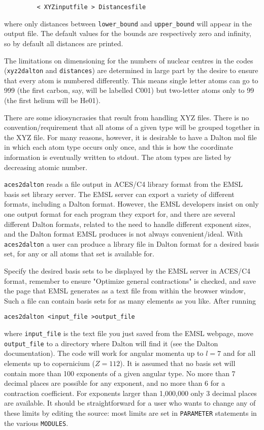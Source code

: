 \noindent
\verb|         < XYZinputfile > Distancesfile|

\noindent
where only distances between \verb|lower_bound| and \verb|upper_bound| will
appear in the output file.  The default values for the bounds are
respectively zero and infinity, so by default all distances are printed.

The limitations on dimensioning for the numbers of nuclear centres in
the codes (\verb|xyz2dalton| and \verb|distances|) are determined in large part by 
the desire to ensure that every atom is numbered differently.  This means
single letter atoms can go to 999 (the first carbon, say, will be labelled
C001) but two-letter atoms only to 99 (the first helium will be He01).

There are some idiosyncrasies that result from handling XYZ files.
There is no convention/require\-ment that all atoms of a given
type will be grouped together in the XYZ file.  For many reasons,
however, it is desirable to have a Dalton
mol file in which each atom type occurs only once, and this is how the
coordinate information is eventually
written to stdout.  The atom types are listed by decreasing atomic number.

\verb|aces2dalton| reads a file output in ACES/C4 library format from
the EMSL 
basis set library server.  The EMSL server can
export a variety of different formats, including a Dalton format.
However, the EMSL developers insist on only one output format for each
program they export for, and there are several different Dalton
formats, related to the need to handle different exponent sizes, and
the Dalton format EMSL produces is not always convenient/ideal.  With
\verb|aces2dalton| a user can produce a library file in Dalton format
for a desired basis set, for any or all atoms that set is available for.

Specify the desired basis sets to be displayed by the EMSL server in
ACES/C4 format, remember to ensure "Optimize general contractions" is
checked, and save the page that EMSL generates as a text file from
within the browser window, Such a file can contain basis sets for as
many elements as you like.  After running

\noindent
\verb|aces2dalton <input_file >output_file|

\noindent
where \verb|input_file| is the text file you just saved from the EMSL
webpage, 
move \verb|output_file| to a directory where Dalton will find it
(see the Dalton documentation).
The code will work for angular momenta up to $l=7$ and for all
elements up to copernicium ($Z=112$).
It is assumed that no basis set will contain more than 100 exponents
of a given angular type.
No more than 7 decimal places are possible for any exponent, and
no more than 6 for a contraction coefficient.  For exponents larger
than 1,000,000 only 3 decimal places are available.  It should be
straightforward for a user who wants to change any of these limits by
editing the source: most limits are set in \verb|PARAMETER| statements
in the various \verb|MODULES|.
